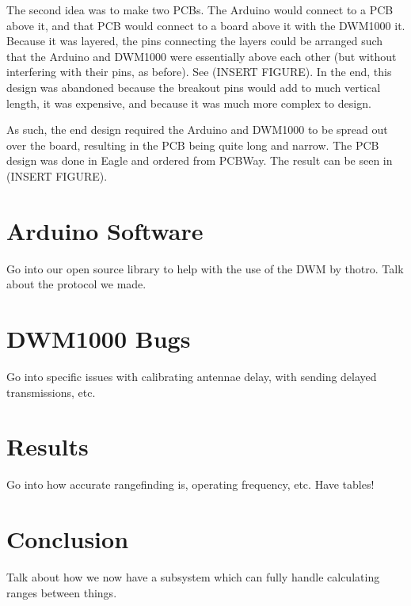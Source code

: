 The second idea was to make two PCBs. The Arduino would connect to a PCB above it, and that PCB would connect to a board above it with the DWM1000 it. Because it was layered, the pins connecting the layers could be arranged such that the Arduino and DWM1000 were essentially above each other (but without interfering with their pins, as before). See (INSERT FIGURE). In the end, this design was abandoned because the breakout pins would add to much vertical length, it was expensive, and because it was much more complex to design.

As such, the end design required the Arduino and DWM1000 to be spread out over the board, resulting in the PCB being quite long and narrow. The PCB design was done in Eagle and ordered from PCBWay. The result can be seen in (INSERT FIGURE).

\section{Arduino Software}


Go into our open source library to help with the use of the DWM by thotro. Talk about the protocol we made.

\section{DWM1000 Bugs}
Go into specific issues with calibrating antennae delay, with sending delayed transmissions, etc.

\section{Results}
Go into how accurate rangefinding is, operating frequency, etc. Have tables!

\section{Conclusion}
Talk about how we now have a subsystem which can fully handle calculating ranges between things.
